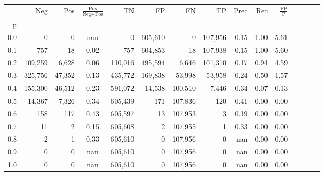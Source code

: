 \begin{tabular}{rrrcrrrrrrrrrrr}
\toprule
{} &      Neg &     Pos & $\frac{\text{Pos}}{\text{Neg}+\text{Pos}}$ &       TN &       FP &       FN &       TP &  Prec &   Rec & $\frac{\text{FP}}{\text{P}}$ \\
p   &          &         &                                            &          &          &          &          &       &       &                              \\
\midrule
0.0 &        0 &       0 &                                        nan &        0 &  605,610 &        0 &  107,956 &  0.15 &  1.00 &                         5.61 \\
0.1 &      757 &      18 &                                       0.02 &      757 &  604,853 &       18 &  107,938 &  0.15 &  1.00 &                         5.60 \\
0.2 &  109,259 &   6,628 &                                       0.06 &  110,016 &  495,594 &    6,646 &  101,310 &  0.17 &  0.94 &                         4.59 \\
0.3 &  325,756 &  47,352 &                                       0.13 &  435,772 &  169,838 &   53,998 &   53,958 &  0.24 &  0.50 &                         1.57 \\
0.4 &  155,300 &  46,512 &                                       0.23 &  591,072 &   14,538 &  100,510 &    7,446 &  0.34 &  0.07 &                         0.13 \\
0.5 &   14,367 &   7,326 &                                       0.34 &  605,439 &      171 &  107,836 &      120 &  0.41 &  0.00 &                         0.00 \\
0.6 &      158 &     117 &                                       0.43 &  605,597 &       13 &  107,953 &        3 &  0.19 &  0.00 &                         0.00 \\
0.7 &       11 &       2 &                                       0.15 &  605,608 &        2 &  107,955 &        1 &  0.33 &  0.00 &                         0.00 \\
0.8 &        2 &       1 &                                       0.33 &  605,610 &        0 &  107,956 &        0 &   nan &  0.00 &                         0.00 \\
0.9 &        0 &       0 &                                        nan &  605,610 &        0 &  107,956 &        0 &   nan &  0.00 &                         0.00 \\
1.0 &        0 &       0 &                                        nan &  605,610 &        0 &  107,956 &        0 &   nan &  0.00 &                         0.00 \\
\bottomrule
\end{tabular}
